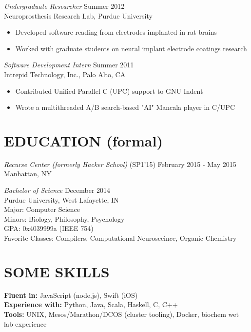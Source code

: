 \documentclass[margin,4pt]{res} %
\begin{document}
\begin{resume}
	{\sl Undergraduate Researcher} \hfill Summer 2012\\
          Neuroprosthesis Research Lab, Purdue University
	    	\begin{itemize} \itemsep -2pt
	    	\item Developed software reading from electrodes implanted in rat brains
	    	\item Worked with graduate students on neural implant electrode coatings research
	    	\end{itemize}

	{\sl Software Development Intern} \hfill Summer 2011\\
          Intrepid Technology, Inc., Palo Alto, CA
          \begin{itemize}  \itemsep -2pt
		\item Contributed Unified Parallel C (UPC) support to GNU Indent
		\item Wrote a multithreaded A/B search-based "AI" Mancala player in C/UPC
		\end{itemize}


\section{EDUCATION (formal)}
	{\sl Recurse Center (formerly Hacker School)} \hfill (SP1'15) February 2015 - May 2015\\
		Manhattan, NY

	{\sl Bachelor of Science }\hfill  December 2014\\
		Purdue University, West Lafayette, IN\\
		Major: Computer Science\\
		Minors: Biology, Philosophy, Psychology \\
		GPA: 0x4039999a (IEEE 754) \\
		Favorite Classes: Compilers, Computational Neurosceince, Organic Chemistry


\section{SOME SKILLS} 
	{\bf Fluent in:} JavaScript (node.js), Swift (iOS)\\
 	{\bf Experience with:}  Python, Java, Scala, Haskell, C, C++\\
	{\bf Tools:} UNIX, Mesos/Marathon/DCOS (cluster tooling), Docker, biochem wet lab experience



\end{resume}
\end{document}
